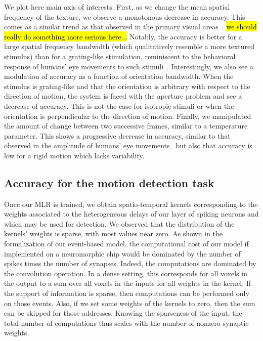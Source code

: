 \documentclass[default]{sn-jnl}%
\theoremstyle{thmstyleone}%
\theoremstyle{thmstyletwo}%
\theoremstyle{thmstylethree}%
\newcommand{\note}[1]{{\sethlcolor{yellow}\hl{#1}}}
\begin{document}
We plot here main axis of interests. First, as we change the mean spatial frequency of the texture, we observe a monotonous decrease in accuracy. This comes as a similar trend as that observed in the primary visual areas~\citep{priebe_tuning_2006}. \note{we should really do something more serious here...} Notably, the accuracy is better for a large spatial frequency bandwidth (which qualitatively resemble a more textured stimulus) than for a grating-like stimulation, reminiscent to the behavioral response of humans' eye movements to such stimuli~\citep{simoncini_more_2012}. Interestingly, we also see a modulation of accuracy as a function of orientation bandwidth. When the stimulus is grating-like and that the orientation is arbitrary with respect to the direction of motion, the system is faced with the aperture problem and see a decrease of accuracy. This is not the case for isotropic stimuli or when the orientation is perpendicular to the direction of motion. Finally, we manipulated the amount of change between two successive frames, similar to a temperature parameter. This shows a progressive decrease in accuracy, similar to that observed in the amplitude of humans' eye movements~\citep{mansour_pour_speed_2018} but also that accuracy is low for a rigid motion which lacks variability.
%
\subsection{Accuracy for the motion detection task}

Once our MLR is trained, we obtain spatio-temporal kernels corresponding to the weights associated to the heterogeneous delays of our layer of spiking neurons and which may be used for detection. We observed that the distribution of the kernels' weights is sparse, with most values near zero. As shown in the formalization of our event-based model, the computational cost of our model if implemented on a neuromorphic chip would be dominated by the number of spikes times the number of synapses. Indeed, the computations are dominated by the convolution operation. In a dense setting, this corresponds for all voxels in the output to a sum over all voxels in the inputs for all weights in the kernel. If the support of information is sparse, then computations can be performed only on those events. Also, if we set some weights of the kernels to zero, then the sum can be skipped for those addresses. Knowing the sparseness of the input, the total number of computations thus scales with the number of nonzero synaptic weights. 
\end{document}
